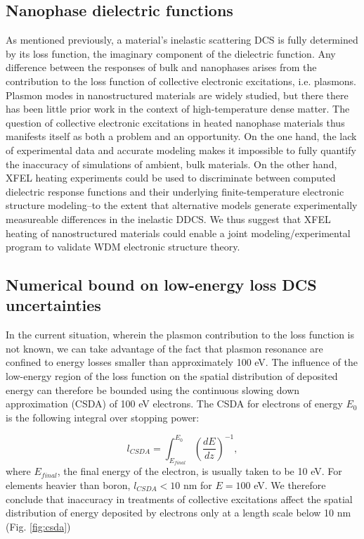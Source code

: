 \documentclass [11pt, proquest, article] {uwthesis}[2016/11/22]
\begin{document}
\subsection{Nanophase dielectric functions}
As mentioned previously, a material's inelastic scattering DCS is fully determined by its loss function, the imaginary component of the dielectric function. Any difference between the responses of bulk and nanophases arises from the contribution to the loss function of collective electronic excitations, i.e. plasmons. Plasmon modes in nanostructured materials are widely studied, but there there has been little prior work in the context of high-temperature dense matter.\cite{jain2007review} The question of collective electronic excitations in heated nanophase materials thus manifests itself as both a problem and an opportunity. On the one hand, the lack of experimental data and accurate modeling makes it impossible to fully quantify the inaccuracy of simulations of ambient, bulk materials. On the other hand, XFEL heating experiments could be used to discriminate between computed dielectric response functions and their underlying finite-temperature electronic structure modeling--to the extent that alternative models generate experimentally measureable differences in the inelastic DDCS. We thus suggest that XFEL heating of nanostructured materials could enable a joint modeling/experimental program to validate WDM electronic structure theory.

\subsection{Numerical bound on low-energy loss DCS uncertainties} \label{ledcs}
In the current situation, wherein the plasmon contribution to the loss function is not known, we can take advantage of the fact that plasmon resonance are confined to energy losses smaller than approximately 100 eV. The influence of the low-energy region of the loss function on the spatial distribution of deposited energy can therefore be bounded using the continuous slowing down approximation (CSDA) of 100 eV electrons. The CSDA for electrons of energy $E_0$ is the following integral over stopping power: 

$$
l_{CSDA} = \int_{E_{final}} ^ {E_0} (\frac{dE}{dz})^{-1},
$$
where $E_{final}$, the final energy of the electron, is usually taken to be 10 eV. For elements heavier than boron, $l_{CSDA} < 10$ nm for $E = 100$ eV. We therefore conclude that inaccuracy in treatments of collective excitations affect the spatial distribution of energy deposited by electrons only at a length scale below 10 nm (Fig. \ref{fig:csda})%
\end{document}
